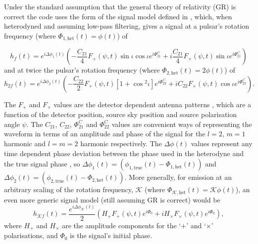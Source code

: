 Under the standard assumption that the general theory of relativity (GR) is correct the code uses the form of
the signal model defined in \citet{2015arXiv150105832J}, which, when heterodyned and assuming low-pass
filtering, gives a signal at a pulsar's rotation frequency (where $\Phi_{1,{\text{het}}}(t) = \phi(t)$) of
\begin{widetext}
\begin{equation}\label{eq:hf}
h_f(t) =  e^{i\Delta\phi_1(t)}\left(-\frac{C_{21}}{4}F_{+}(\psi,t)\sin{\iota}\cos{\iota}e^{i\Phi_{21}^C} +
i\frac{C_{21}}{4}F_{\times}(\psi,t)\sin{\iota}e^{i\Phi_{21}^C} \right)
\end{equation}
and at twice the pulsar's rotation frequency (where $\Phi_{2,{\text{het}}}(t) = 2\phi(t)$) of
\begin{equation}\label{eq:h2f}
h_{2f}(t) =  e^{i\Delta\phi_2(t)}\left(-\frac{C_{22}}{2}F_{+}(\psi,t)[1+\cos{}^2\iota]e^{i\Phi_{22}^C} +
iC_{22}F_{\times}(\psi,t)\cos{\iota}e^{i\Phi_{22}^C} \right).
\end{equation}
\end{widetext}
The $F_{+}$ and $F_{\times}$ values are the detector dependent antenna patterns \citep[see, e.g., equation~\ref{eq:antenna}, taken from][]{1998PhRvD..58f3001J},
which are a function of the
detector position, source sky position and source polarisation angle $\psi$. The $C_{21}$, $C_{22}$,
$\Phi_{21}^C$ and $\Phi_{22}^C$ values are convenient ways of representing the waveform in terms of an
amplitude and phase of the signal for the $l=2$, $m=1$ harmonic and $l=m=2$ harmonic respectively. The
$\Delta\phi(t)$ values represent any time dependent phase deviation between the phase used in the heterodyne
and the true signal phase \citep[which does not necessarily have to precisely follow the electromagnetically observed rotational phase, see discussions in, e.g.,][]{2008ApJ...683L..45A}, so
$\Delta\phi_1(t) = (\phi_{1,{\text{true}}}(t)-\Phi_{1,{\text{het}}}(t))$ and $\Delta\phi_2(t) = (\phi_{2,{\text{true}}}(t)-\Phi_{2,{\text{het}}}(t))$. More generally,
for emission at an arbitrary scaling of the rotation frequency, $\mathcal{K}$ (where $\Phi_{\mathcal{K},{\text{het}}}(t) = \mathcal{K}\phi(t)$), an even more generic signal model (still assuming GR is correct) would be
\begin{equation}\label{eq:hkf}
h_{\mathcal{K}f}(t) =  \frac{e^{i\Delta\phi_{\mathcal{K}}(t)}}{2}\left(H_+F_{+}(\psi,t)e^{i\Phi_0} +
iH_{\times}F_{\times}(\psi,t)e^{i\Phi_{0}} \right),
\end{equation}
where $H_+$ and $H_{\times}$ are the amplitude components for the `$+$' and `$\times$' polarisations, and $\Phi_0$ is the signal's initial phase.

